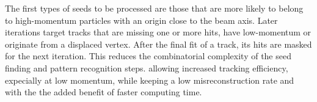 The first types of seeds to be processed are those that are more likely to belong to high-momentum particles with an origin close to the beam axis.
Later iterations target tracks that are missing one or more hits, have low-momentum or originate from a displaced vertex.
After the final fit of a track, its hits are masked for the next iteration.
This reduces the combinatorial complexity of the seed finding and pattern recognition steps.
allowing increased tracking efficiency, expecially at low momentum, while keeping a low misreconstruction rate
and with the the added benefit of faster computing time. %

